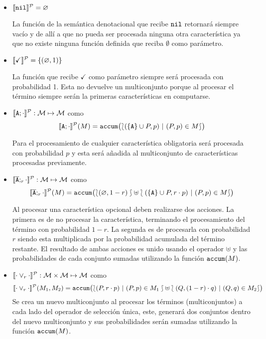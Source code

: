   \begin{itemize}
  	
  \item $[\![\mathtt{nil}]\!]^{\cal P}=\varnothing$
  
  La función de la semántica denotacional que recibe
  $\mathtt{nil}$ retornará siempre vacío y de allí a que
  no pueda ser procesada ninguna otra característica
  ya que no existe ninguna función definida que reciba
  $\emptyset$ como parámetro.
  
  \item $[\![\checkmark]\!]^{\cal P}=\{(\varnothing,1)\}$
  
  La función que recibe $\checkmark$ como
  parámetro siempre será procesada con probabilidad 1.
  Esta no devuelve un multiconjunto porque al 
  procesar el término siempre serán la primeras
  características en computarse.
  
  \item 
    $[\![\mathtt{A};\cdot]\!]^{\cal P}:{\cal M}\mapsto{\cal M}$
    como
    $$[\![\mathtt{A};\cdot]\!]^{\cal P}(M)= 
      \mathtt{accum}\bigl(\lbag(\{\mathtt{A}\}\cup P,p)\ |\ (P,p)\in M\rbag\bigr)
         $$
  
  Para el procesamiento de cualquier característica obligatoria
  será procesada con probabilidad $p$ y esta será añadida
  al multiconjunto de características procesadas previamente.
  

  \item 
    $[\![\overline{\mathtt{A}};_{r}\cdot]\!]^{\cal P}:{\cal M}\mapsto{\cal M}$
    como
    $$[\![\overline{\mathtt{A}};_{r}\cdot]\!]^{\cal P}(M)=
                \mathtt{accum}\bigl(\lbag(\varnothing , 1-r )\rbag\uplus\lbag (\{\mathtt{A}\}\cup P, r\cdot p ) \ |\ (P,p) \in M\rbag\bigr)$$

  Al procesar una característica opcional deben realizarse
  dos acciones. La primera es de no procesar la característica,
  terminando el procesamiento del término con probabilidad $1-r$.
  La segunda es de procesarla con probabilidad $r$ siendo esta
  multiplicada por la probabilidad acumulada
  del término restante. El resultado de ambas acciones es
  unido usando el operador $\uplus$ y las probabilidades 
  de cada conjunto sumadas utilizando la función $\mathtt{accum}(M)$.
  
  \item 
    $[\![\cdot\mathbin{\lor}_{r}\cdot]\!]^{\cal P}:{\cal M}\times{\cal M}\mapsto{\cal M}$
    como 
    $$[\![\cdot\mathbin{\lor}_{r}\cdot]\!]^{\cal P}(M_{1},M_{2})=\mathtt{accum}\bigl(\lbag(P,r\cdot p  ) \ |\ (P,p) \in
    M_{1}\rbag \uplus \lbag(Q, (1-r)\cdot q  ) \ |\ (Q,q) \in M_{2}\rbag\bigr) $$
  Se crea un nuevo multiconjunto al procesar los términos (multiconjuntos) a cada
  lado del operador de selección única, este, generará dos conjuntos dentro del
  nuevo multiconjunto y sus probabilidades serán sumadas utilizando la función $\mathtt{accum}(M)$.


\end{itemize}
